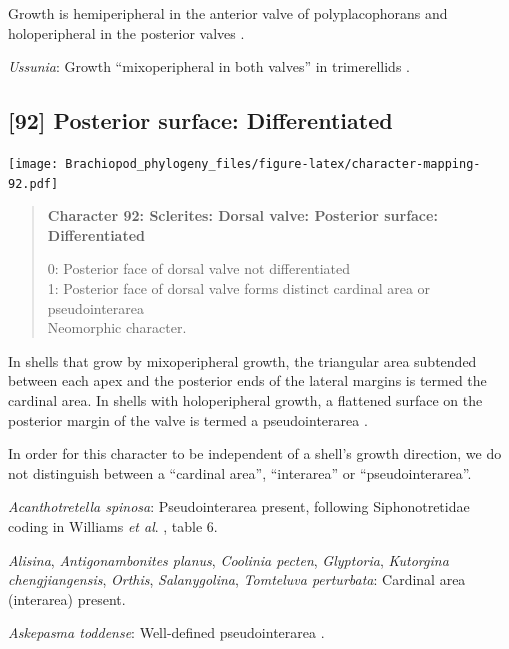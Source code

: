 \documentclass[openany]{book}
\begin{document}
Growth is hemiperipheral in the anterior valve of polyplacophorans and
holoperipheral in the posterior valves \citep{Schwabe2010, Connors2012}.

\hypertarget{Ussunia-coding-91}{}
\emph{Ussunia}: Growth ``mixoperipheral in both valves'' in trimerellids
\citep{Williams2000LinguliformeaCraniiformea, Popov1997}.

\subsection*{{[}92{]} Posterior surface:
Differentiated}\label{posterior-surface-differentiated}

\texttt{[image: Brachiopod\_phylogeny\_files/figure-latex/character-mapping-92.pdf]}

\begin{quote}
\textbf{Character 92: Sclerites: Dorsal valve: Posterior surface:
Differentiated}

0: Posterior face of dorsal valve not differentiated\\
1: Posterior face of dorsal valve forms distinct cardinal area or
pseudointerarea\\
Neomorphic character.
\end{quote}

In shells that grow by mixoperipheral growth, the triangular area
subtended between each apex and the posterior ends of the lateral
margins is termed the cardinal area. In shells with holoperipheral
growth, a flattened surface on the posterior margin of the valve is
termed a pseudointerarea
\citep[paraphrasing][]{Williams1997Introduction}.

In order for this character to be independent of a shell's growth
direction, we do not distinguish between a ``cardinal area'',
``interarea'' or ``pseudointerarea''.

\hypertarget{Acanthotretella_spinosa-coding-92}{}
\emph{Acanthotretella spinosa}: Pseudointerarea present, following
Siphonotretidae coding in Williams \emph{et al}.
\citeyearpar{Williams2000LinguliformeaCraniiformea}, table 6.

\hypertarget{Alisina-coding-92}{}
\emph{Alisina}, \emph{Antigonambonites planus}, \emph{Coolinia pecten},
\emph{Glyptoria}, \emph{Kutorgina chengjiangensis}, \emph{Orthis},
\emph{Salanygolina}, \emph{Tomteluva perturbata}: Cardinal area
(interarea) present.

\hypertarget{Askepasma_toddense-coding-92}{}
\emph{Askepasma toddense}: Well-defined pseudointerarea
\citep[p153]{Williams2000LinguliformeaCraniiformea}.
\end{document}
